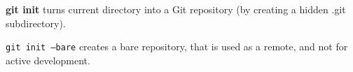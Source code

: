 %

\textbf{git init} turns current directory into a Git repository (by creating a hidden .git subdirectory).

\texttt{git init --bare} creates a bare repository, that is used as a remote, and not for active development.

%